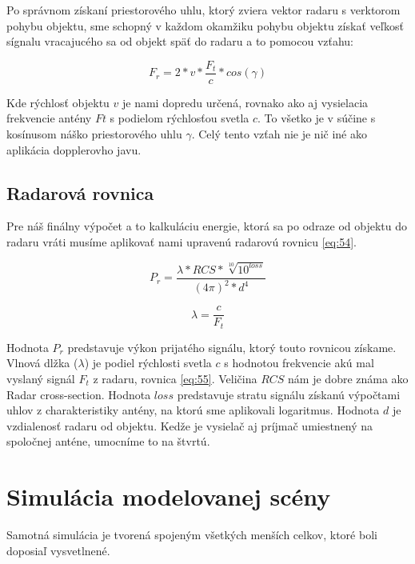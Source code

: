 \documentclass[slovak]{ExcelAtFIT} %
\begin{document}
      \hspace{0.6cm}Po správnom získaní priestorového uhlu, ktorý zviera vektor radaru s verktorom pohybu objektu, sme schopný v každom okamžiku pohybu objektu získať veľkosť sígnalu vracajucého sa od objekt späť do radaru a to pomocou vzťahu:

        \begin{equation} %
          F_{r} = 2 * v * \frac{F_{t}}{c} * cos(\gamma)
        \end{equation}   

      Kde rýchlosť objektu $v$ je nami dopredu určená, rovnako ako aj vysielacia frekvencie antény $Ft$ s podie\-lom rýchlosťou svetla $c$. To všetko je v súčine s kosínusom náško priestorového uhlu $\gamma$.
      Celý tento vzťah nie je nič iné ako aplikácia dopplerovho javu.

    \subsection{Radarová rovnica}

      Pre náš finálny výpočet a to kalkuláciu energie, ktorá sa po odraze od objektu do radaru vráti musíme aplikovať nami upravenú radarovú rovnicu \ref{eq:54}.

      \begin{equation} \label{eq:54}
        P_{r} = \frac{\lambda * RCS * \sqrt[10]{10^{loss}}}{(4\pi)^{2} * d^{4}}
      \end{equation}   

      \begin{equation} \label{eq:55}
        \lambda = \frac{c}{F_{t}}
      \end{equation}         

      Hodnota $P_{r}$ predstavuje výkon prijatého signálu, ktorý touto rovnicou získame. Vlnová dlžka ($\lambda$) je podiel rýchlosti svetla $c$ s hodnotou frekvencie akú mal vyslaný signál $F_{t}$ z radaru, rovnica \ref{eq:55}. Veličina $RCS$ nám je dobre známa ako Radar cross-section. Hodnota $loss$ predstavuje stratu signálu získanú výpočtami uhlov z charakteristiky antény, na ktorú sme aplikovali logaritmus.
      Hodnota $d$ je vzdialenosť radaru od objektu. Kedže je vysielač aj príjmač umiestnený na spoločnej anténe, umocníme to na štvrtú.

  \section{Simulácia modelovanej scény}
    \hspace{0.6cm}Samotná simulácia je tvorená spojeným všetkých menších celkov, ktoré boli doposiaľ vysvetlnené.
\end{document}
